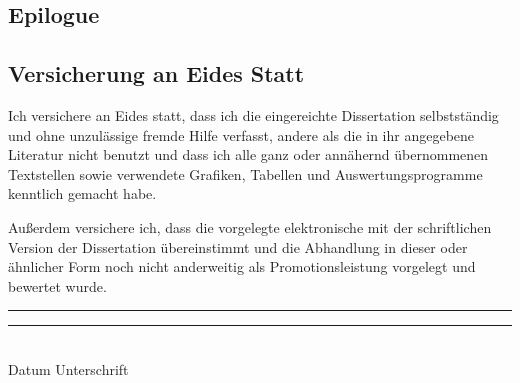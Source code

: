 \documentclass{dissertation}
\begin{document}




\begin{fullwidth}
\part{Epilogue}
\end{fullwidth}



\begin{fullwidth}
\printbibliography{}
\clearpage{}
%
%
%
%
%
%
\end{fullwidth}

\cleardoublepage{}

\chapter*{Versicherung an Eides Statt}

Ich versichere an Eides statt, dass ich die eingereichte Dissertation selbstständig und ohne unzulässige fremde Hilfe verfasst, andere als die in ihr angegebene Literatur nicht benutzt und dass ich alle ganz oder annähernd übernommenen Textstellen sowie verwendete Grafiken, Tabellen und Auswertungsprogramme kenntlich gemacht habe.

Außerdem versichere ich, dass die vorgelegte elektronische mit der schriftlichen Version der Dissertation übereinstimmt und die Abhandlung in dieser oder ähnlicher Form noch nicht anderweitig als Promotionsleistung vorgelegt und bewertet wurde.

\vspace{1cm}
\noindent
\rule{45mm}{0.1pt} \hfill{} \rule{45mm}{0.1pt}\\
Datum \hfill{} Unterschrift

\cleardoublepage{}
\end{document}
